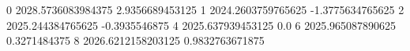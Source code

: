 0 2028.5736083984375 2.9356689453125
1 2024.2603759765625 -1.3775634765625
2 2025.244384765625 -0.3935546875
4 2025.637939453125 0.0
6 2025.965087890625 0.3271484375
8 2026.6212158203125 0.9832763671875

